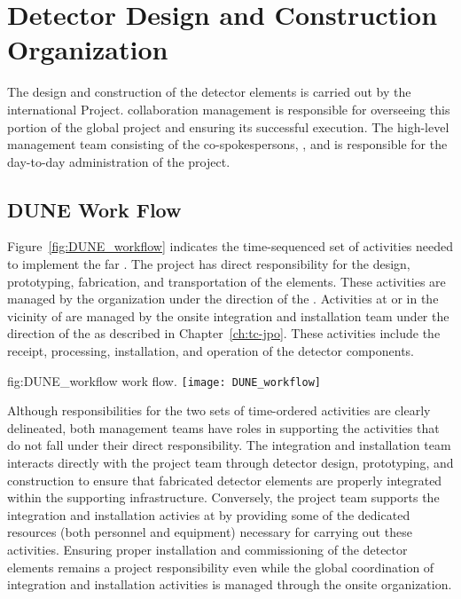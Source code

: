 ﻿\chapter{Detector Design and Construction Organization}
\label{vl:tc-overview}

The design and construction of the  detector elements is 
carried out by the international  Project.  
collaboration management is responsible for overseeing this portion 
of the global project and ensuring its successful execution.  
The high-level  management team consisting of the 
co-spokespersons, , and  is responsible 
for the day-to-day administration of the project.  

\section{DUNE Work Flow}
\label{sec:workflow}

Figure~\ref{fig:DUNE_workflow} indicates the time-sequenced set of 
activities needed to implement the  far .
The  project has direct responsibility for the design, 
prototyping, fabrication, and transportation of the  
elements.  These activities are managed by the   
organization under the direction of the .  Activities at 
or in the vicinity of  are managed by the onsite integration and
installation team under the direction of the  as described 
in Chapter~\ref{ch:tc-jpo}.  These activities include the receipt,
processing, installation, and operation of the detector components.            
\begin{dunefigure}{fig:DUNE_workflow}
  { work flow.}
  \texttt{[image: DUNE\_workflow]}
\end{dunefigure}

Although responsibilities for the two sets of time-ordered activities 
are clearly delineated, both management teams have roles in supporting
the activities that do not fall under their direct responsibility.  The 
integration and installation team interacts directly with the  
project team through detector design, prototyping, and construction to 
ensure that fabricated detector elements are properly integrated within 
the supporting infrastructure.  Conversely, the  project team %
supports the integration and installation activies at  by providing 
some of the dedicated resources (both personnel and equipment) necessary 
for carrying out these activities.  Ensuring proper installation and 
commissioning of the detector elements remains a  project
responsibility even while the global coordination of integration and 
installation activities is managed through the onsite organization.  

